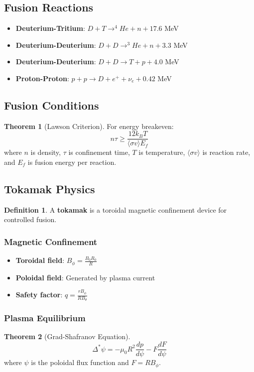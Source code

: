 \documentclass[11pt]{article}
\theoremstyle{definition}
\newtheorem{definition}{Definition}[section]
\newtheorem{theorem}{Theorem}[section]
\begin{document}
\subsection{Fusion Reactions}
\begin{itemize}
    \item \textbf{Deuterium-Tritium}: $D + T \to ^4He + n + 17.6$ MeV
    \item \textbf{Deuterium-Deuterium}: $D + D \to ^3He + n + 3.3$ MeV
    \item \textbf{Deuterium-Deuterium}: $D + D \to T + p + 4.0$ MeV
    \item \textbf{Proton-Proton}: $p + p \to D + e^+ + \nu_e + 0.42$ MeV
\end{itemize}

\subsection{Fusion Conditions}
\begin{theorem}[Lawson Criterion]
For energy breakeven:
$$n\tau \geq \frac{12k_B T}{\langle \sigma v \rangle E_f}$$
where $n$ is density, $\tau$ is confinement time, $T$ is temperature, $\langle \sigma v \rangle$ is reaction rate, and $E_f$ is fusion energy per reaction.
\end{theorem}

\subsection{Tokamak Physics}
\begin{definition}
A \textbf{tokamak} is a toroidal magnetic confinement device for controlled fusion.
\end{definition}

\subsubsection{Magnetic Confinement}
\begin{itemize}
    \item \textbf{Toroidal field}: $B_\phi = \frac{B_0 R_0}{R}$
    \item \textbf{Poloidal field}: Generated by plasma current
    \item \textbf{Safety factor}: $q = \frac{r B_\phi}{R B_\theta}$
\end{itemize}

\subsubsection{Plasma Equilibrium}
\begin{theorem}[Grad-Shafranov Equation]
$$\Delta^* \psi = -\mu_0 R^2 \frac{dp}{d\psi} - F \frac{dF}{d\psi}$$
where $\psi$ is the poloidal flux function and $F = RB_\phi$.
\end{theorem}
\end{document}
